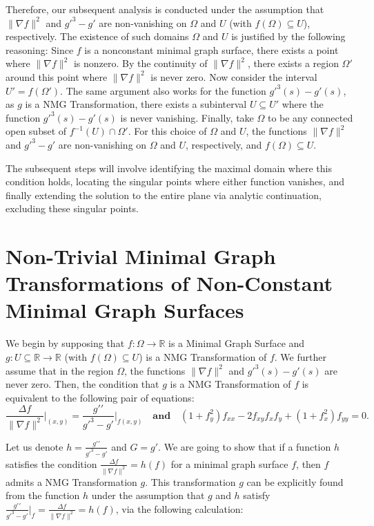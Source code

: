 \documentclass[12pt]{article}
\theoremstyle{plain}
\theoremstyle{definition}
\theoremstyle{remark}
\begin{document}
    Therefore, our subsequent analysis is conducted under the assumption that \(\|\nabla f\|^2\) and \(g\prime^3 - g\prime\) are non-vanishing on \(\Omega\) and \(U\) (with \(f(\Omega) \subseteq U\)), respectively. The existence of such domains \(\Omega\) and \(U\) is justified by the following reasoning: Since \(f\) is a nonconstant minimal graph surface, there exists a point where \(\|\nabla f\|^2\) is nonzero. By the continuity of \(\|\nabla f\|^2\), there exists a region \(\Omega'\) around this point where \(\|\nabla f\|^2\) is never zero. Now consider the interval \(U' = f(\Omega')\). The same argument also works for the function \(g\prime^3(s) - g\prime(s)\), as \(g\) is a NMG Transformation, there exists a subinterval \(U \subseteq U'\) where the function \(g\prime^3(s) - g\prime(s)\) is never vanishing. Finally, take \(\Omega\) to be any connected open subset of \(f^{-1}(U) \cap \Omega'\). For this choice of \(\Omega\) and \(U\), the functions \(\|\nabla f\|^2\) and \(g\prime^3 - g\prime\) are non-vanishing on \(\Omega\) and \(U\), respectively, and \(f(\Omega) \subseteq U\).
    
    The subsequent steps will involve identifying the maximal domain where this condition holds, locating the singular points where either function vanishes, and finally extending the solution to the entire plane via analytic continuation, excluding these singular points.

  \section{Non-Trivial Minimal Graph Transformations of Non-Constant Minimal Graph Surfaces}
   We begin by supposing that \( f : \Omega \longrightarrow \mathbb{R} \) is a Minimal Graph Surface and \(g: U \subseteq \mathbb{R} \longrightarrow \mathbb{R}\) (with \(f(\Omega)\subseteq U\)) is a NMG Transformation of \(f\). We further assume that in the region \(\Omega\), the functions \(\|\nabla f\|^2\) and \(g\prime^3(s) - g\prime(s)\) are never zero. Then, the condition that \(g\) is a NMG Transformation of \(f\) is equivalent to the following pair of equations:
   \[
     \boxed{\frac{\Delta f}{\|\nabla f\|^2}\Bigg|_{(x,y)}=\frac{g\prime\prime}{g\prime^3 - g\prime}\Bigg|_{f(x,y)}} \quad \textbf{and} \quad \boxed{(1 + f_y^2) f_{xx} - 2 f_{xy} f_x f_y + (1 + f_x^2) f_{yy} = 0}.
   \]
    
   Let us denote \(h = \frac{g\prime\prime}{g\prime^3 - g\prime}\) and \(G = g\prime\). We are going to show that if a function \(h\) satisfies the condition \(\frac{\Delta f}{\|\nabla f\|^2} = h(f)\) for a minimal graph surface \(f\), then \(f\) admits a NMG Transformation \(g\). This transformation \(g\) can be explicitly found from the function \(h\) under the assumption that \(g\) and \(h\) satisfy \(\frac{g\prime\prime}{g\prime^3 - g\prime} \big|_f = \frac{\Delta f}{\|\nabla f\|^2} = h(f)\), via the following calculation:
     
\end{document}
